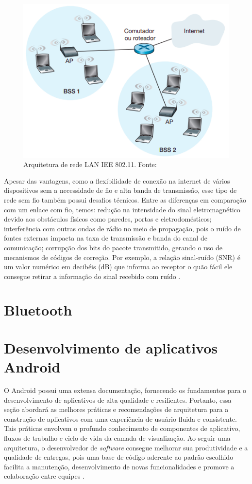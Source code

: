 \begin{figure}[ht]
    \centering
    \includegraphics[width=.42\textwidth]{img/wifi-design.png}
    \caption{Arquitetura de rede LAN IEE 802.11. Fonte:\cite{redeskurose2010}}\label{figWifi}
\end{figure}

Apesar das vantagens, como a flexibilidade de conexão na internet de vários dispositivos sem a necessidade 
de fio e alta banda de transmissão, esse tipo de rede sem fio também possui desafios técnicos. Entre as diferenças 
em comparação com um enlace com fio, temos: redução na intensidade do sinal eletromagnético devido aos obstáculos físicos 
como paredes, portas e eletrodomésticos; interferência com outras ondas de rádio no meio de propagação, pois o ruído de fontes
externas impacta na taxa de transmissão e banda do canal de comunicação; corrupção dos bits do pacote transmitido, gerando 
o uso de mecanismos de códigos de correção. Por exemplo, a relação sinal-ruído (SNR) é um valor numérico em decibéis (dB) que informa 
ao receptor o quão fácil ele consegue retirar a informação do sinal recebido com ruído \cite[pp. 408]{redeskurose2010}.

\section{Bluetooth}

\section{Desenvolvimento de aplicativos Android}

O Android possui uma extensa documentação, fornecendo os fundamentos para o desenvolvimento de 
aplicativos de alta qualidade e resilientes. Portanto, essa seção abordará as melhores práticas e recomendações
de arquitetura para a construção de aplicativos com uma experiência de usuário fluida e consistente. Tais práticas envolvem o profundo
conhecimento de componentes de aplicativo, fluxos de trabalho e ciclo de vida da camada de visualização. Ao seguir uma arquitetura, 
o desenvolvedor de \textit{software} consegue melhorar sua produtividade e a qualidade de entregas, pois uma base de código aderente ao 
padrão escolhido facilita a manutenção, desenvolvimento de novas funcionalidades e promove a colaboração entre equipes \cite{google-developers-guideline}.

